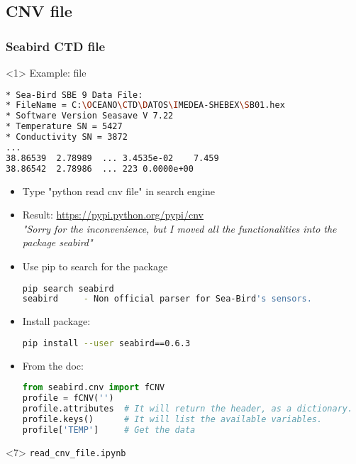 \subsection{CNV file}

\begin{frame}[fragile]
\frametitle{Seabird CTD file}

\begin{onlyenv}<1>
Example: file 

\begin{lstlisting}[language=bash,basicstyle=\tiny,title={Example of CNV file}]
* Sea-Bird SBE 9 Data File:
* FileName = C:\OCEANO\CTD\DATOS\IMEDEA-SHEBEX\SB01.hex
* Software Version Seasave V 7.22
* Temperature SN = 5427
* Conductivity SN = 3872
...
38.86539  2.78989  ... 3.4535e-02    7.459    
38.86542  2.78986  ... 223 0.0000e+00
\end{lstlisting}
\end{onlyenv}

\begin{itemize}
\item<2-7> Type "python read cnv file" in search engine
\item<3-7> Result: \url{https://pypi.python.org/pypi/cnv}\\
{\tiny\it "Sorry for the inconvenience, but I moved all the functionalities into the package seabird"}
\item<4-7> Use pip to search for the package
\begin{lstlisting}[language=bash,basicstyle=\tiny]
pip search seabird
seabird     - Non official parser for Sea-Bird's sensors.
\end{lstlisting}
\item<5-7> Install package:
\begin{lstlisting}[language=bash,basicstyle=\tiny]
pip install --user seabird==0.6.3
\end{lstlisting}
\item<6-7> From the doc:
\begin{lstlisting}[language=python,basicstyle=\tiny]
from seabird.cnv import fCNV
profile = fCNV('')
profile.attributes 	# It will return the header, as a dictionary.
profile.keys()		# It will list the available variables.
profile['TEMP']   	# Get the data
\end{lstlisting}
\end{itemize}

\vfill 
\begin{onlyenv}<7>
\notebook \verb|read_cnv_file.ipynb|
\end{onlyenv}

\end{frame}


